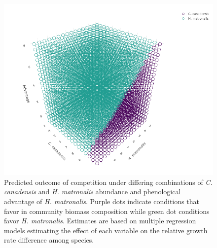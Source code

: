\documentclass{article}\usepackage[]{graphicx}\usepackage[]{color}
\begin{document}
\begin{figure}[h!]
    \centering
\includegraphics[width=\textwidth]{..//figure/3dconnolly2.png}
   \caption{Predicted outcome of competition under differing combinations of \textit{C. canadensis} and \textit{H. matronalis} abundance and phenological advantage of \textit{H. matronalis}. Purple dots indicate conditions that favor   in community biomass composition while green dot conditions favor \textit{H. matronalis}. Estimates are based on multiple regression models estimating the effect of each variable on the relative growth rate difference among species.} 
   \label{fig:3D}
\end{figure}
\end{document}
